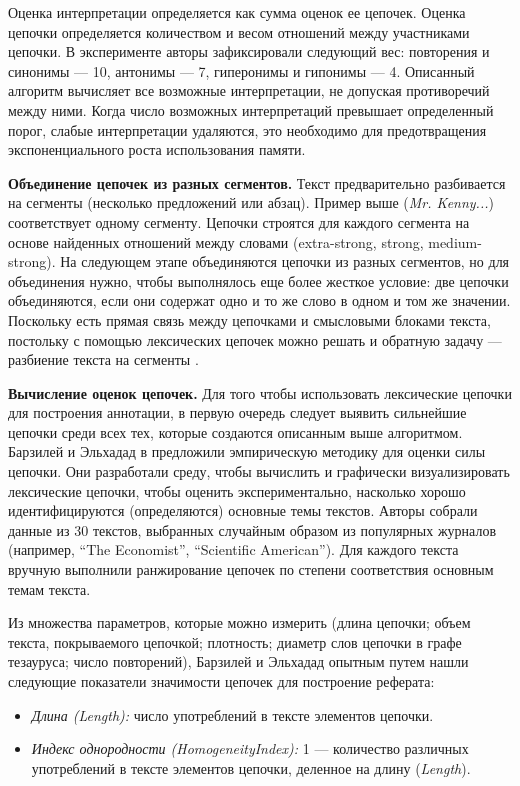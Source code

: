 \documentclass{article}
\begin{document}
\begin{articletext}
Оценка интерпретации определяется как сумма оценок ее цепочек. 
Оценка цепочки определяется количеством и весом отношений между участниками цепочки. 
В эксперименте авторы зафиксировали следующий вес: повторения и синонимы  --- 10, антонимы --- 7, 
гиперонимы и гипонимы --- 4. Описанный алгоритм вычисляет все возможные интерпретации, 
не допуская противоречий между ними. 
Когда число возможных интерпретаций превышает определенный порог, слабые интерпретации удаляются, 
это необходимо для предотвращения экспоненциального роста использования памяти.


\textbf{Объединение цепочек из разных сегментов.} Текст предварительно разбивается на сегменты (несколько предложений или абзац). Пример выше (\textit{Mr. Kenny...}) соответствует одному сегменту. Цепочки строятся для каждого сегмента на основе найденных отношений между словами (extra-strong, strong, medium-strong). На следующем этапе объединяются цепочки из разных сегментов, но для объединения нужно, чтобы выполнялось еще более жесткое условие: две цепочки объединяются, если они содержат одно и то же слово в одном и том же значении. Поскольку есть прямая связь между цепочками и смысловыми блоками текста, постольку с помощью лексических цепочек можно решать и обратную задачу --- разбиение текста на сегменты \cite{Barzilay Elhadad 1997}.

\textbf{Вычисление оценок цепочек.} Для того чтобы использовать лексические цепочки для построения аннотации, в первую очередь следует выявить сильнейшие цепочки среди всех тех, которые создаются описанным выше алгоритмом. Барзилей и Эльхадад в \cite{Barzilay Elhadad 1997}  предложили  эмпирическую методику для оценки силы цепочки. Они разработали среду, чтобы вычислить и графически визуализировать лексические цепочки, чтобы оценить экспериментально, насколько хорошо идентифицируются (определяются) основные темы текстов. Авторы собрали данные из 30 текстов, выбранных случайным образом из популярных журналов (например, “The Economist”, “Scientific American”). Для каждого текста вручную выполнили ранжирование цепочек по степени соответствия основным темам текста. 

Из множества параметров, которые можно измерить (длина цепочки; объем текста, покрываемого цепочкой; плотность; диаметр слов цепочки в графе тезауруса; число повторений), Барзилей и Эльхадад \cite{Barzilay Elhadad 1997} опытным путем нашли следующие показатели значимости цепочек для построение реферата:

\begin{itemize}
\item \textit{Длина (Length):} число употреблений в тексте элементов цепочки.
\item \textit{Индекс однородности (HomogeneityIndex):} 1 --- количество различных употреблений в тексте элементов цепочки, деленное на длину (\textit{Length}).
\end{itemize}


\end{articletext}
\end{document}
